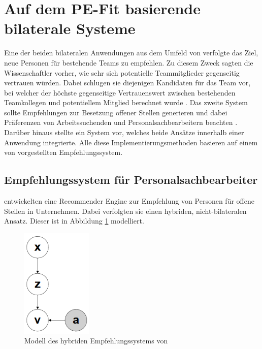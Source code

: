 \section{Auf dem PE-Fit basierende bilaterale Systeme}
\label{ch:verwandteArbeiten:aufDemPEFitBasierendeBilateraleSysteme}
Eine der beiden bilateralen Anwendungen aus dem Umfeld von \textcite[S. 1ff.]{malinowski:2006} verfolgte das Ziel, neue Personen für bestehende Teams zu empfehlen. Zu diesem Zweck sagten die Wissenschaftler vorher, wie sehr sich potentielle Teammitglieder gegenseitig vertrauen würden. Dabei schlugen sie diejenigen Kandidaten für das Team vor, bei welcher der höchste gegenseitige Vertrauenswert zwischen bestehenden Teamkollegen und potentiellem Mitglied berechnet wurde \cite[S. 5ff.]{keim:2005}\cite[S. 1ff.]{malinowski:2005}. Das zweite System sollte Empfehlungen zur Besetzung offener Stellen generieren und dabei Präferenzen von Arbeitssuchenden und Personalsachbearbeitern beachten \cite[S. 1ff.]{malinowski:2006}. Darüber hinaus stellte \textcite[S. 5ff.]{keim:2007} ein System vor, welches beide Ansätze innerhalb einer Anwendung integrierte. Alle diese Implementierungsmethoden basieren auf einem von \textcite[S. 6ff.]{faerber:2003} vorgestellten Empfehlungssystem.

\subsection{Empfehlungssystem für Personalsachbearbeiter}
\label{ch:verwandteArbeiten:aufDemPEFitBasierendeBilateraleSysteme:grundlegendesEmpfelungssystem}
\textcite[S. 4ff.]{faerber:2003} entwickelten eine Recommender Engine zur Empfehlung von Personen für offene Stellen in Unternehmen. Dabei verfolgten sie einen hybriden, nicht-bilateralen Ansatz. Dieser ist in Abbildung \ref{fig:verwandteArbeiten:abb1} modelliert.

\begin{figure}[h]
	\centering
	\includegraphics[width=0.3\textwidth]{gfx/faerber.png}
	\caption{Modell des hybriden Empfehlungssystems von \textcite[S. 8]{faerber:2003}}
	\label{fig:verwandteArbeiten:abb1}
\end{figure}

